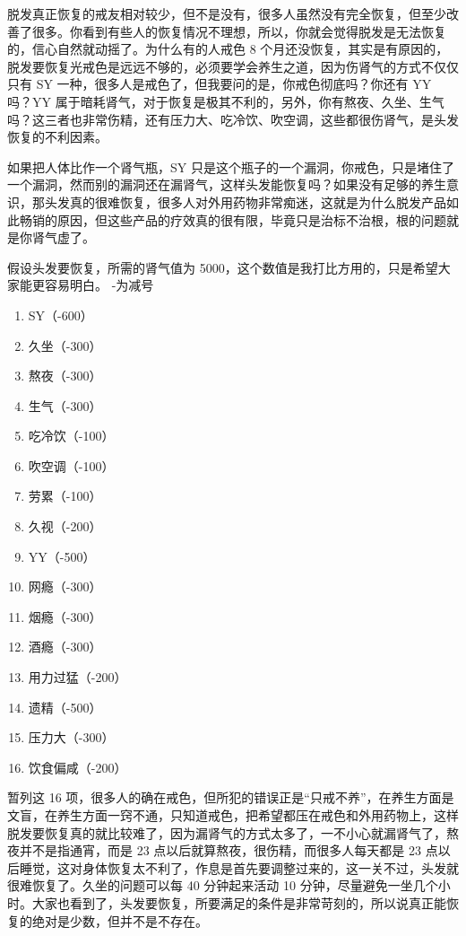 \documentclass{ctexart}
\begin{document}
脱发真正恢复的戒友相对较少，但不是没有，很多人虽然没有完全恢复，但至少改善了很多。你看到有些人的恢复情况不理想，所以，你就会觉得脱发是无法恢复的，信心自然就动摇了。为什么有的人戒色 8 个月还没恢复，其实是有原因的，脱发要恢复光戒色是远远不够的，必须要学会养生之道，因为伤肾气的方式不仅仅只有 SY 一种，很多人是戒色了，但我要问的是，你戒色彻底吗？你还有 YY 吗？YY 属于暗耗肾气，对于恢复是极其不利的，另外，你有熬夜、久坐、生气吗？这三者也非常伤精，还有压力大、吃冷饮、吹空调，这些都很伤肾气，是头发恢复的不利因素。

如果把人体比作一个肾气瓶，SY 只是这个瓶子的一个漏洞，你戒色，只是堵住了一个漏洞，然而别的漏洞还在漏肾气，这样头发能恢复吗？如果没有足够的养生意识，那头发真的很难恢复，很多人对外用药物非常痴迷，这就是为什么脱发产品如此畅销的原因，但这些产品的疗效真的很有限，毕竟只是治标不治根，根的问题就是你肾气虚了。

假设头发要恢复，所需的肾气值为 5000，这个数值是我打比方用的，只是希望大家能更容易明白。
-为减号

\begin{enumerate}
    \item SY（-600）
    \item 久坐（-300）
    \item 熬夜（-300）
    \item 生气（-300）
    \item 吃冷饮（-100）
    \item 吹空调（-100）
    \item 劳累（-100）
    \item 久视（-200）
    \item YY（-500）
    \item 网瘾（-300）
    \item 烟瘾（-300）
    \item 酒瘾（-300）
    \item 用力过猛（-200）
    \item 遗精（-500）
    \item 压力大（-300）
    \item 饮食偏咸（-200）
\end{enumerate}

暂列这 16 项，很多人的确在戒色，但所犯的错误正是“只戒不养”，在养生方面是文盲，在养生方面一窍不通，只知道戒色，把希望都压在戒色和外用药物上，这样脱发要恢复真的就比较难了，因为漏肾气的方式太多了，一不小心就漏肾气了，熬夜并不是指通宵，而是 23 点以后就算熬夜，很伤精，而很多人每天都是 23 点以后睡觉，这对身体恢复太不利了，作息是首先要调整过来的，这一关不过，头发就很难恢复了。久坐的问题可以每 40 分钟起来活动 10 分钟，尽量避免一坐几个小时。大家也看到了，头发要恢复，所要满足的条件是非常苛刻的，所以说真正能恢复的绝对是少数，但并不是不存在。
\end{document}
